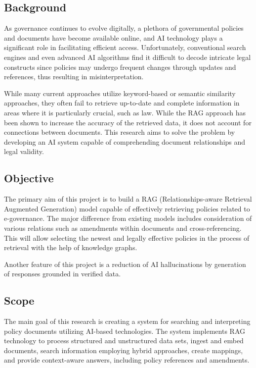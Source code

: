 \documentclass[conference]{IEEEtran}
\begin{document}
\subsection{Background}
As governance continues to evolve digitally, a plethora of governmental policies and documents have become available online, and AI technology plays a significant role in facilitating efficient access. Unfortunately, conventional search engines and even advanced AI algorithms find it difficult to decode intricate legal constructs since policies may undergo frequent changes through updates and references, thus resulting in misinterpretation.

While many current approaches utilize keyword-based or semantic similarity approaches, they often fail to retrieve up-to-date and complete information in areas where it is particularly crucial, such as law. While the RAG approach has been shown to increase the accuracy of the retrieved data, it does not account for connections between documents. This research aims to solve the problem by developing an AI system capable of comprehending document relationships and legal validity.

\subsection{Objective}
The primary aim of this project is to build a RAG (Relationships-aware Retrieval Augmented Generation) model capable of effectively retrieving policies related to e-governance. The major difference from existing models includes consideration of various relations such as amendments within documents and cross-referencing. This will allow selecting the newest and legally effective policies in the process of retrieval with the help of knowledge graphs.

Another feature of this project is a reduction of AI hallucinations by generation of responses grounded in verified data.

\subsection{Scope}
The main goal of this research is creating a system for searching and interpreting policy documents utilizing AI-based technologies. The system implements RAG technology to process structured and unstructured data sets, ingest and embed documents, search information employing hybrid approaches, create mappings, and provide context-aware answers, including policy references and amendments.
\end{document}
